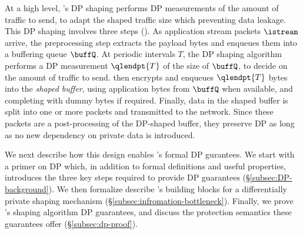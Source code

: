 At a high level, \sys's DP shaping performs DP measurements of the amount
of traffic to send, to adapt the shaped traffic size which preventing data
leakage.
This DP shaping involves three steps ().
 As application stream packets $\istream$ arrive, the preprocessing
step extracts the payload bytes and enqueues them into a buffering queue $\buffQ$.
 At periodic intervals $T$, the DP shaping algorithm
performs a DP measurement $\qlendpt{T}$ of the size of $\buffQ$, to decide on the
amount of traffic to send.
{\sys} then encrypts and enqueues $\qlendpt{T}$ bytes into the {\em shaped
buffer}, using application bytes from $\buffQ$ when available, and completing
with dummy bytes if required.
 Finally, data in the shaped buffer is split into one or more packets
and transmitted to the network. Since these packets are a post-processing of the
DP-shaped buffer, they preserve DP as long as no new dependency on private data
is introduced.

We next describe how this design enables \sys's formal DP gurantees.
We start with a primer on DP which, in addition to formal definitions and useful
properties, introduces the three key steps required to provide DP guarantees
(\S\ref{subsec:DP-background}).
We then formalize describe \sys's building blocks for a differentially private
shaping mechanism (\S\ref{subsec:infromation-bottleneck}).
Finally, we prove \sys's shaping algorithm DP guarantees, and discuss the protection
semantics these guarantees offer (\S\ref{subsec:dp-proof}).



